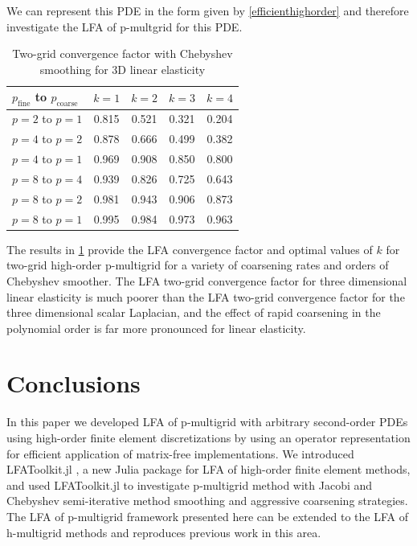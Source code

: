 \documentclass[review]{siamart190516}
\begin{document}
We can represent this PDE in the form given by \cref{efficienthighorder} and therefore investigate the LFA of p-multgrid for this PDE.

\begin{table}[ht!]
\begin{center}
\begin{tabular}{l c c c c}
  \toprule
  $p_{\text{fine}}$ to $p_{\text{coarse}}$  &  $k = 1$   &  $k = 2$   &  $k = 3$   &  $k = 4$   \\
  \toprule
  $p = 2$ to $p = 1$   &  0.815  &  0.521  &  0.321  &  0.204  \\
  \midrule
  $p = 4$ to $p = 2$   &  0.878  &  0.666  &  0.499  &  0.382  \\
  $p = 4$ to $p = 1$   &  0.969  &  0.908  &  0.850  &  0.800  \\
  \midrule
  $p = 8$ to $p = 4$   &  0.939  &  0.826  &  0.725  &  0.643  \\
  $p = 8$ to $p = 2$   &  0.981  &  0.943  &  0.906  &  0.873  \\
  $p = 8$ to $p = 1$   &  0.995  &  0.984  &  0.973  &  0.963  \\
  \bottomrule
\end{tabular}
\end{center}
\caption{Two-grid convergence factor with Chebyshev smoothing for 3D linear elasticity}
\label{table:two_grid_3d_linear_elasticity}
\end{table}

The results in \cref{table:two_grid_3d_linear_elasticity} provide the LFA convergence factor and optimal values of $k$ for two-grid high-order p-multigrid for a variety of coarsening rates and orders of Chebyshev smoother.
The LFA two-grid convergence factor for three dimensional linear elasticity is much poorer than the LFA two-grid convergence factor for the three dimensional scalar Laplacian, and the effect of rapid coarsening in the polynomial order is far more pronounced for linear elasticity.

\section{Conclusions}\label{sec:conclusion}

In this paper we developed LFA of p-multigrid with arbitrary second-order PDEs using high-order finite element discretizations by using an operator representation for efficient application of matrix-free implementations.
We introduced LFAToolkit.jl \cite{thompson2021toolkit}, a new Julia package for LFA of high-order finite element methods, and used LFAToolkit.jl to investigate p-multigrid method with Jacobi and Chebyshev semi-iterative method smoothing and aggressive coarsening strategies.
The LFA of p-multigrid framework presented here can be extended to the LFA of h-multigrid methods and reproduces previous work in this area.
\end{document}
